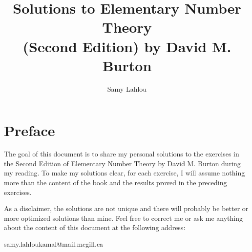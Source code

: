 \documentclass[12pt, oneside]{book}
\title{Solutions to Elementary Number Theory \\ (Second Edition) by David M. Burton}
\author{Samy Lahlou}
\newcounter{exercise}[section] %
\begin{document}
\maketitle

\chapter*{Preface}

The goal of this document is to share my personal solutions to the exercises in the Second Edition of Elementary Number Theory by David M. Burton during my reading. To make my solutions clear, for each exercise, I will assume nothing more than the content of the book and the results proved in the preceding exercises.

As a disclaimer, the solutions are not unique and there will probably be better or more optimized solutions than mine. Feel free to correct me or ask me anything about the content of this document at the following address: 

samy.lahloukamal@mail.mcgill.ca

\tableofcontents




\end{document}

